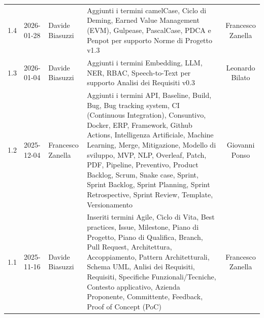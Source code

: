 \documentclass[a4paper, 11pt, oneside]{scrartcl} %
\begin{document}
\begin{center}
{\begin{tabular}{@{}llp{}p{}c@{}}
            1.4                                                                                                                                                            & 2026-01-28      & Davide Biasuzzi   & Aggiunti i termini camelCase, Ciclo di Deming, Earned Value Management (EVM), Gulpease, PascalCase, PDCA e Penpot per supporto Norme di Progetto v1.3                                                                                                                                                                                                                                                                                    & Francesco Zanella     \\
            1.3                                                                                                                                                            & 2026-01-04      & Davide Biasuzzi   & Aggiunti i termini Embedding, LLM, NER, RBAC, Speech-to-Text per supporto Analisi dei Requisiti v0.3                                                                                                                                                                                                                                                                                                                                     & Leonardo Bilato       \\
            1.2                                                                                                                                                            & 2025-12-04      & Francesco Zanella & Aggiunti i termini API, Baseline, Build, Bug, Bug tracking system, CI (Continuous Integration), Consuntivo, Docker, ERP, Framework, Github Actions, Intelligenza Artificiale, Machine Learning, Merge, Mitigazione, Modello di sviluppo, MVP, NLP, Overleaf, Patch, PDF, Pipeline, Preventivo, Product Backlog, Scrum, Snake case, Sprint, Sprint Backlog, Sprint Planning, Sprint Retrospective, Sprint Review, Template, Versionamento & Giovanni Ponso        \\
            1.1                                                                                                                                                            & 2025-11-16      & Davide Biasuzzi   & Inseriti termini Agile, Ciclo di Vita, Best practices, Issue, Milestone, Piano di Progetto, Piano di Qualifica, Branch, Pull Request, Architettura, Accoppiamento, Pattern Architetturali, Schema UML, Anlisi dei Requisiti, Requisiti, Specifiche Funzionali/Tecniche, Contesto applicativo, Azienda Proponente, Committente, Feedback, Proof of Concept (PoC)                                                                          & Francesco Zanella     \\

\end{tabular}}
\end{center}
\end{document}
